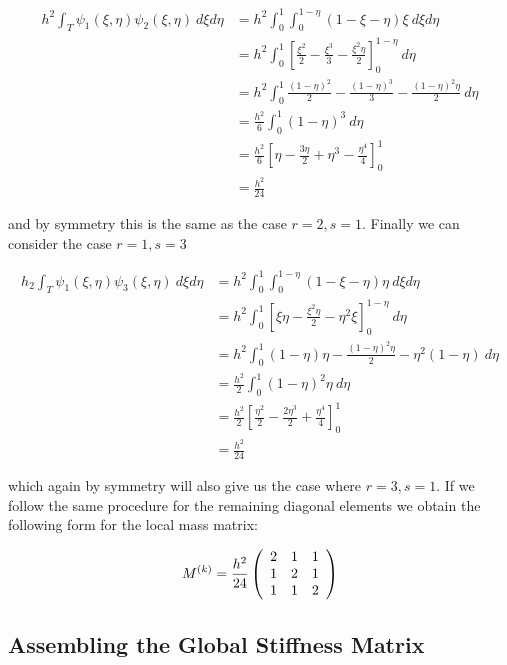 \begin{align*}
    h^2\int_T\psi_1(\xi,\eta)\psi_2(\xi,\eta)\ d\xi d\eta
    &=  h^2\int_0^1\int_0^{1-\eta}(1 - \xi -\eta)\xi\ d\xi d\eta \\
    &= h^2\int_0^1\left[\frac{\xi^2}{2} -\frac{\xi^3}{3}
                        -\frac{\xi^2\eta}{2}\right]_0^{1-\eta}\  d\eta \\
    &= h^2\int_0^1\frac{(1-\eta)^2}{2} - \frac{(1-\eta)^3}{3}- \frac{(1-\eta)^2\eta}{2}\ d\eta \\
    &= \frac{h^2}{6}\int_0^1(1- \eta)^3\ d\eta \\
    &= \frac{h^2}{6}\left[\eta -\frac{3\eta}{2} + \eta^3 - \frac{\eta^4}{4}\right]_0^1 \\
    &= \frac{h^2}{24}
\end{align*}

and by symmetry this is the same as the case $r = 2, s = 1$. Finally we can consider the case
$r = 1, s = 3$

\begin{align*}
    h_2\int_T\psi_1(\xi, \eta)\psi_3(\xi, \eta)\ d\xi d\eta
    &= h^2\int_0^1\int_0^{1-\eta}(1 - \xi - \eta)\eta\ d\xi d\eta \\
    &= h^2\int_0^1\left[\xi\eta - \frac{\xi^2\eta}{2} - \eta^2\xi\right]_0^{1-\eta}\ d\eta \\
    &= h^2\int_0^1(1-\eta)\eta - \frac{(1 - \eta)^2\eta}{2} - \eta^2(1 - \eta)\ d\eta \\
    &= \frac{h^2}{2}\int_0^1(1 - \eta)^2\eta \ d\eta \\
    &= \frac{h^2}{2}\left[\frac{\eta^2}{2} - \frac{2\eta^3}{2} + \frac{\eta^4}{4}\right]_0^1 \\
    &= \frac{h^2}{24}
\end{align*}

which again by symmetry will also give us the case where $r = 3, s = 1$. If we
follow the same procedure for the remaining diagonal elements we obtain the
following form for the local mass matrix:

\begin{equation}\label{eq:twod-local-mass}
    M^{(k)} =
    \frac{h^2}{24}\left(\begin{array}{c c c}
         2 &  1 &  1 \\
         1 &  2 &  1 \\
         1 &  1 &  2
      \end{array}\right)
\end{equation}

\subsection{Assembling the Global Stiffness Matrix}\label{sec:twod-global-stiffnes-assembly}

